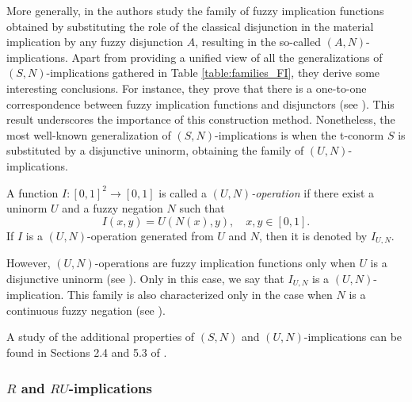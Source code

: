 More generally, in \cite{Pradera2016} the authors study the family of fuzzy implication functions obtained by substituting the role of the classical disjunction in the material implication by any fuzzy disjunction $A$, resulting in the so-called $(A,N)$-implications. Apart from providing a unified view of all the generalizations of $(S,N)$-implications gathered in Table \ref{table:families_FI}, they derive some interesting conclusions. For instance, they prove that there is a one-to-one correspondence between fuzzy implication functions and disjunctors (see \cite[Theorem 40]{Pradera2016}). This result underscores the importance of this construction method. Nonetheless, the most well-known generalization of $(S,N)$-implications is when the t-conorm $S$ is substituted by a disjunctive uninorm, obtaining the family of $(U,N)$-implications.
\begin{definition}\label{def:(U,N)}
	A function $I:[0,1]^2 \to [0,1]$ is called a \emph{$(U,N)$-operation} if there exist a uninorm $U$ and a fuzzy negation $N$ such that
	$$I(x,y)=U(N(x),y), \quad x,y \in [0,1].$$
	If $I$ is a $(U,N)$-operation generated from $U$ and $N$, then it is denoted by $I_{U,N}$.
\end{definition}

However, $(U,N)$-operations are fuzzy implication functions only when $U$ is a disjunctive uninorm (see \cite[Theorem 5.3]{Backzynski2009}). Only in this case, we say that $I_{U,N}$ is a $(U,N)$-implication. This family is also characterized only in the case when $N$ is a continuous fuzzy negation (see \cite[Theorem 6.5]{Backzynski2009}).

A study of the additional properties of $(S,N)$ and $(U,N)$-implications can be found in Sections 2.4 and 5.3 of \cite{Baczynski2008}.


\subsubsection{$R$ and $RU$-implications}

